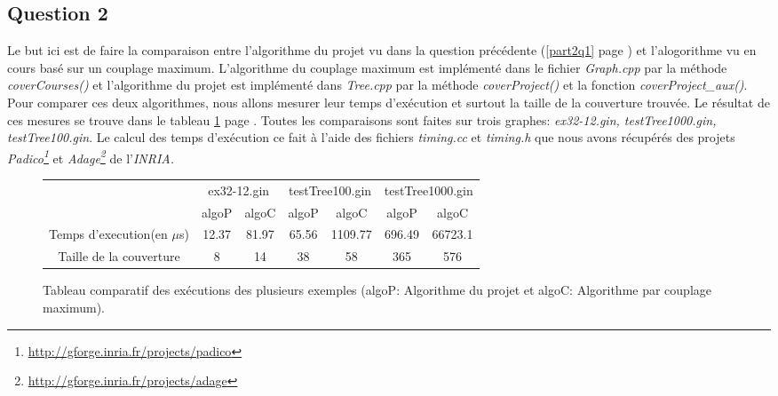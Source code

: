   \subsection{Question 2}
  Le but ici est de faire la comparaison entre l'algorithme du projet vu
  dans la question précédente (\ref{part2q1} page \pageref{part2q1}) et
  l'alogorithme vu en cours basé sur un couplage maximum.\newline
  \indent L'algorithme du couplage maximum est implémenté dans le fichier
  \emph{Graph.cpp} par la méthode \emph{coverCourses()} et l'algorithme
  du projet est implémenté dans \emph{Tree.cpp} par la méthode
  \emph{coverProject()} et la fonction \emph{coverProject\_aux()}.\newline
  \indent Pour comparer ces deux algorithmes, nous allons mesurer leur
  temps d'exécution et surtout la taille de la couverture trouvée. Le
  résultat de ces mesures se trouve dans le tableau \ref{tableau}
  page \pageref{tableau}. Toutes les comparaisons sont faites sur trois
  graphes: \emph{ex32-12.gin, testTree1000.gin, testTree100.gin}.\newline
  \indent Le calcul des temps d'exécution ce fait à l'aide des fichiers
  \emph{timing.cc} et \emph{timing.h} que nous avons récupérés des
  projets \emph{Padico\footnote{\url{http://gforge.inria.fr/projects/padico}}}
  et \emph{Adage\footnote{\url{http://gforge.inria.fr/projects/adage}}} de
  l'\emph{INRIA.}\newline

  \begin{figure}[!ht]
   \begin{center}
    \begin{tabular}{|c|c|c||c|c||c|c|}
     \cline{2-7}
     \multicolumn{1}{c|}{} & \multicolumn{2}{|c||}{ex32-12.gin}
     &\multicolumn{2}{|c||}{testTree100.gin} &
     \multicolumn{2}{|c|}{testTree1000.gin}\\ 
     \cline{2-7}
     \multicolumn{1}{c|}{} & algoP & algoC & algoP & algoC & algoP &
     algoC\\
     \hline
     Temps d'execution(en $\mu$s) & 12.37 & 81.97 & 65.56 & 1109.77 &
     696.49 & 66723.1\\
     \hline
     Taille de la couverture & 8 & 14 & 38 & 58 & 365 & 576\\
     \hline
    \end{tabular}
    \caption{Tableau comparatif des exécutions des plusieurs
    exemples (algoP: Algorithme du projet et algoC: Algorithme par
    couplage maximum).\label{tableau}} 
   \end{center}
  \end{figure}  

